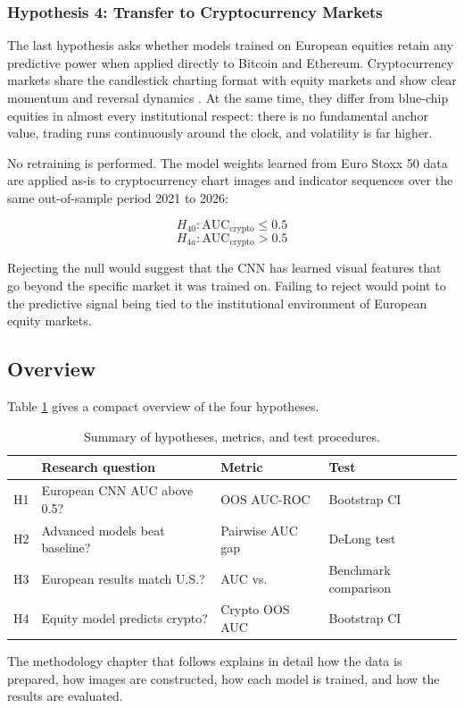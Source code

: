 \subsubsection*{Hypothesis 4: Transfer to Cryptocurrency Markets}

The last hypothesis asks whether models trained on European equities retain any predictive power when applied directly to Bitcoin and Ethereum. Cryptocurrency markets share the candlestick charting format with equity markets and show clear momentum and reversal dynamics \parencite{liu2021}. At the same time, they differ from blue-chip equities in almost every institutional respect: there is no fundamental anchor value, trading runs continuously around the clock, and volatility is far higher.

No retraining is performed. The model weights learned from Euro Stoxx 50 data are applied as-is to cryptocurrency chart images and indicator sequences over the same out-of-sample period 2021 to 2026:

\begin{equation}
  H_{40}: \text{AUC}_{\text{crypto}} \leq 0.5
\end{equation}
\begin{equation}
  H_{4a}: \text{AUC}_{\text{crypto}} > 0.5
\end{equation}

Rejecting the null would suggest that the CNN has learned visual features that go beyond the specific market it was trained on. Failing to reject would point to the predictive signal being tied to the institutional environment of European equity markets.

\subsection{Overview}

Table \ref{tab:hypotheses_summary} gives a compact overview of the four hypotheses.

\begin{table}[H]
  \centering
  \caption{Summary of hypotheses, metrics, and test procedures.}
  \label{tab:hypotheses_summary}
  \begin{tabular}{clll}
    \toprule
    & \textbf{Research question} & \textbf{Metric} & \textbf{Test} \\
    \midrule
    H1 & European CNN AUC above 0.5?       & OOS AUC-ROC        & Bootstrap CI \\[3pt]
    H2 & Advanced models beat baseline?    & Pairwise AUC gap   & DeLong test  \\[3pt]
    H3 & European results match U.S.?      & AUC vs.\ \textcite{Jiang2023} & Benchmark comparison \\[3pt]
    H4 & Equity model predicts crypto?     & Crypto OOS AUC     & Bootstrap CI \\
    \bottomrule
  \end{tabular}
\end{table}

The methodology chapter that follows explains in detail how the data is prepared, how images are constructed, how each model is trained, and how the results are evaluated.
